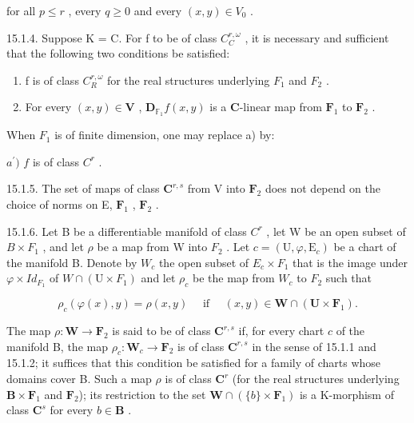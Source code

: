 for all \(p \leqslant r\) , every \(q \geqslant 0\) and every \((x, y) \in V_0\) .

15.1.4. Suppose K = C. For f to be of class \(C_{C}^{r,\omega}\) , it is necessary and sufficient that the following two conditions be satisfied:

\begin{enumerate}
\def\labelenumi{\alph{enumi})}
\item
  f is of class \(C_{R}^{r,\omega}\) for the real structures underlying \(F_{1}\) and \(F_{2}\) .
\item
  For every \((x, y) \in \mathbf{V}\) , \(\mathbf{D}_{\mathbb{F}_1} f(x, y)\) is a \(\mathbf{C}\)-linear map from \(\mathbf{F}_1\) to \(\mathbf{F}_2\) .
\end{enumerate}

When \(F_{1}\) is of finite dimension, one may replace a) by:

\(\mathit{a}^{\prime})\) \(f\) is of class \(C^{r}\) .

15.1.5. The set of maps of class \(\mathbf{C}^{r,s}\) from V into \(\mathbf{F}_2\) does not depend on the choice of norms on E, \(\mathbf{F}_1\) , \(\mathbf{F}_2\) .

15.1.6. Let B be a differentiable manifold of class \(C^{r}\) , let W be an open subset of \(B \times F_{1}\) , and let \(\rho\) be a map from W into \(F_{2}\) . Let \(c = (\mathrm{U}, \varphi, \mathrm{E}_{c})\) be a chart of the manifold B. Denote by \(W_{c}\) the open subset of \(E_{c} \times F_{1}\) that is the image under \(\varphi \times Id_{F_{1}}\) of \(W \cap (\mathrm{U} \times F_{1})\) and let \(\rho_{c}\) be the map from \(W_{c}\) to \(F_{2}\) such that

\[
\rho_{c}(\varphi(x),y) = \rho(x,y) \quad \text { if } \quad (x,y) \in \mathbf{W} \cap (\mathbf{U} \times \mathbf{F}_{1}).
\]

The map \(\rho\colon\mathbf{W}\to\mathbf{F}_{2}\) is said to be of class \(\mathbf{C}^{r,s}\) if, for every chart \(c\) of the manifold B, the map \(\rho_{c}\colon\mathbf{W}_{c}\to\mathbf{F}_{2}\) is of class \(\mathbf{C}^{r,s}\) in the sense of 15.1.1 and 15.1.2; it suffices that this condition be satisfied for a family of charts whose domains cover B. Such a map \(\rho\) is of class \(\mathbf{C}^{r}\) (for the real structures underlying \(\mathbf{B}\times\mathbf{F}_{1}\) and \(\mathbf{F}_{2}\)); its restriction to the set \(\mathbf{W}\cap(\{b\}\times\mathbf{F}_{1})\) is a K-morphism of class \(\mathbf{C}^{s}\) for every \(b\in\mathbf{B}\) .

